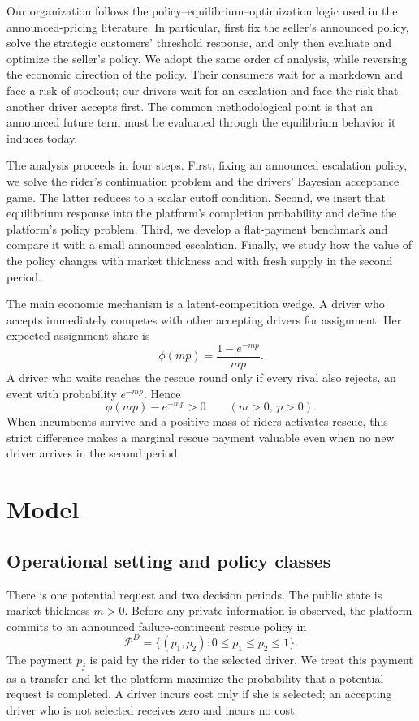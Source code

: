 \documentclass[11pt]{article}
\theoremstyle{definition}
\theoremstyle{remark}
\begin{document}
Our organization follows the policy--equilibrium--optimization logic used in
the announced-pricing literature.  In particular, \citet{AvivPazgal2008}
first fix the seller's announced policy, solve the strategic customers'
threshold response, and only then evaluate and optimize the seller's policy.
We adopt the same order of analysis, while reversing the economic direction of
the policy.  Their consumers wait for a markdown and face a risk of stockout;
our drivers wait for an escalation and face the risk that another driver
accepts first.  The common methodological point is that an announced future
term must be evaluated through the equilibrium behavior it induces today.

The analysis proceeds in four steps.  First, fixing an announced escalation
policy, we solve the rider's continuation problem and the drivers' Bayesian
acceptance game.  The latter reduces to a scalar cutoff condition.  Second, we
insert that equilibrium response into the platform's completion probability
and define the platform's policy problem.  Third, we develop a flat-payment
benchmark and compare it with a small announced escalation.  Finally, we study
how the value of the policy changes with market thickness and with fresh supply
in the second period.

The main economic mechanism is a latent-competition wedge.  A driver who
accepts immediately competes with other accepting drivers for assignment.  Her
expected assignment share is
\[
  \phi(mp)=\frac{1-e^{-mp}}{mp}.
\]
A driver who waits reaches the rescue round only if every rival also rejects,
an event with probability \(e^{-mp}\).  Hence
\[
  \phi(mp)-e^{-mp}>0
  \qquad (m>0,\ p>0).
\]
When incumbents survive and a positive mass of riders activates rescue, this
strict difference makes a marginal rescue payment valuable even when no new
driver arrives in the second period.

\section{Model}
\label{sec:model}

\subsection{Operational setting and policy classes}

There is one potential request and two decision periods.  The public state is
market thickness \(m>0\).  Before any private information is observed, the
platform commits to an announced failure-contingent rescue policy in
\[
  \mathcal P^D
  =\{(p_1,p_2):0\le p_1\le p_2\le1\}.
\]
The payment \(p_j\) is paid by the rider to the selected driver.  We treat this
payment as a transfer and let the platform maximize the probability that a
potential request is completed.  A driver incurs cost only if she is selected;
an accepting driver who is not selected receives zero and incurs no cost.
\end{document}
